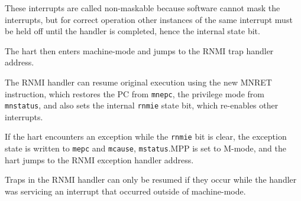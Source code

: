 \begin{commentary}
These interrupts are called non-maskable because software cannot
mask the interrupts, but for correct operation other instances of the
same interrupt must be held off until the handler is completed, hence
the internal state bit.
\end{commentary}

The hart then enters machine-mode and jumps to the RNMI trap handler
address.

The RNMI handler can resume original execution using the new MNRET
instruction, which restores the PC from {\tt mnepc}, the privilege mode
from {\tt mnstatus}, and also sets the internal {\tt rnmie} state bit, which
re-enables other interrupts.

If the hart encounters an exception while the {\tt rnmie} bit is clear, the
exception state is written to {\tt mepc} and {\tt mcause}, {\tt mstatus}.MPP is
set to M-mode, and the hart jumps to the RNMI exception handler
address.

\begin{commentary}
Traps in the RNMI handler can only be resumed if they occur while
the handler was servicing an interrupt that occurred outside of
machine-mode.
\end{commentary}
